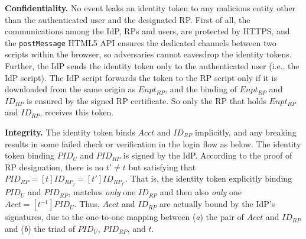 %

\vspace{0.5mm}
\noindent\textbf{Confidentiality.}
No event leaks an identity token to any malicious entity other than the authenticated user and the designated RP.
First of all, the communications among the IdP, RPs and users,
    are protected by HTTPS,
    and the \verb+postMessage+ HTML5 API ensures the dedicated channels between two scripts within the browser,
    so adversaries cannot eavesdrop the identity tokens.
Further, the IdP sends the identity token only to the authenticated user
        (i.e., the IdP script).
The IdP script forwards the token to the RP script
 only if it is downloaded from the same origin as $Enpt_{RP}$,
and the binding of $Enpt_{RP}$ and $ID_{RP}$ is ensured by the signed RP certificate.
So only the RP that holds $Enpt_{RP}$ and $ID_{RP}$,
    receives this token.


\vspace{0.5mm}
\noindent\textbf{Integrity.}
The identity token binds $Acct$ and $ID_{RP}$ implicitly,
    and any breaking results in some failed check or verification in the login flow as below.
The identity token binding $PID_U$ and $PID_{RP}$ is signed by the IdP.
According to the proof of RP designation,
    there is no $t' \neq t$ but satisfying that $PID_{RP} = [t]ID_{RP_j} = [t']ID_{RP_{j'}}$.
That is, the identity token explicitly binding $PID_U$ and $PID_{RP}$,
    matches \emph{only} one $ID_{RP}$ and then also \emph{only} one $Acct = [t^{-1}]PID_{U}$.
Thus,
    $Acct$ and $ID_{RP}$ are actually bound by the IdP's signatures,
        due to the one-to-one mapping between (\emph{a}) the pair of $Acct$ and $ID_{RP}$ and (\emph{b}) the triad of $PID_U$, $PID_{RP}$, and $t$.

